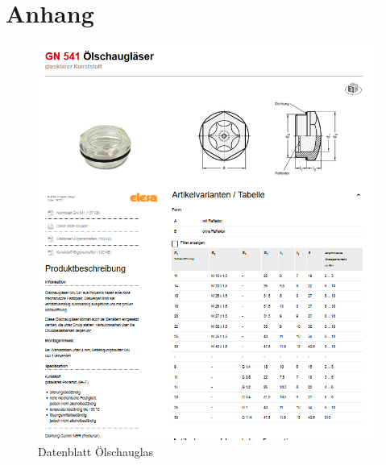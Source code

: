 \chapter{Anhang}
\newpage
\begin{figure}[H]
	\includegraphics[width=1.1\textwidth,keepaspectratio]{figures/Oelschauglas.png}
	\caption{Datenblatt Ölschauglas \protect\cite{bib:www:schauglas}}
	\label{fig:Reibbelag}
\end{figure}

